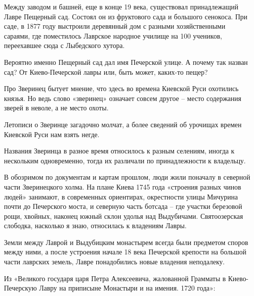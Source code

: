 Между заводом и башней, еще в конце 19 века, существовал принадлежащий Лавре Пещерный сад. Состоял он из фруктового сада и большого сенокоса. При саде, в 1877 году выстроили деревянный дом с разными хозяйственными сараями, где поместилось Лаврское народное училище на 100 учеников, переехавшее сюда с Лыбедского хутора.

Вероятно именно Пещерный сад дал имя Печерской улице. А почему так назван сад? От Киево-Печерской лавры или, быть может, каких-то пещер?

Про Зверинец бытует мнение, что здесь во времена Киевской Руси охотились князья. Но ведь слово «зверинец» означает совсем другое – место содержания зверей в неволе, а не место охоты.

Летописи о Зверинце загадочно молчат, а более сведений об урочищах времен Киевской Руси нам взять негде.%

Названия Зверинца в разное время относилось к разным селениям, иногда к нескольким одновременно, тогда их различали по принадлежности к владельцу.

В обозримом по документам и картам прошлом, люди жили поначалу в северной части Зверинецкого холма. На плане Киева 1745 года «строения разных чинов людей» занимают, в современных ориентирах, окрестности улицы Мичурина почти до Печерского моста, и северную часть ботсада – где участки березовой рощи, хвойных, наконец южный склон удолья над Выдубичами. Святоозерская слободка, насколько я знаю, относилась к владениям Лавры.

Земли между Лаврой и Выдубицким монастырем всегда были предметом споров между ними, а после устроения начале 18 века Печерской крепости на большой части лаврских земель, Лавре понадобились новые владения неподалеку.

Из «Великого государя царя Петра Алексеевича, жалованной Грамматы в Киево-Печерскую Лавру на приписыне Монастыри и на имения. 1720 года»:

